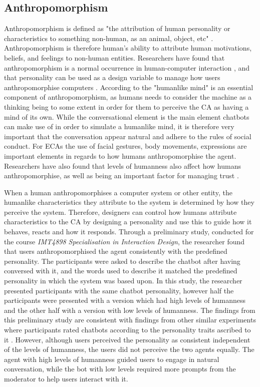 \vspace{2,5mm}

\subsection{Anthropomorphism}
    \label{anthropomorphism}
Anthropomorphism is defined as "the attribution of human personality or characteristics to something non-human, as an animal, object, etc" \citep{oxd2018}. Anthropomorphism is therefore human's ability to attribute human motivations, beliefs, and feelings to non-human entities. Researchers have found that anthropomorphism is a normal occurrence in human-computer interaction \citep{Reeves1996,Cohen2004,Pearl2017,Lee2010}, and that personality can be used as a design variable to manage how users anthropomorphise computers \citep{Xiao2005}. According to \cite{Schroeder2016} the "humanlike mind" is an essential component of anthropomorphism, as humans needs to consider the machine as a thinking being to some extent in order for them to perceive the CA as having a mind of its own. While the conversational element is the main element chatbots can make use of in order to simulate a humanlike mind, it is therefore very important that the conversation appear natural and adhere to the rules of social conduct. For ECAs the use of facial gestures, body movements, expressions are important elements in regards to how humans anthropomorphise the agent. Researchers have also found that levels of humanness also affect how humans anthropomorphise, as well as being an important factor for managing trust \citep{Prada2003,Meyer2016,Dautenhahn2002,Terada2015,Epley2007,Lee2004}.

When a human anthropomorphises a computer system or other entity, the humanlike characteristics they attribute to the system is determined by how they perceive the system. Therefore, designers can control how humans attribute characteristics to the CA by designing a personality and use this to guide how it behaves, reacts and how it responds. Through a preliminary study, conducted for the course \textit{IMT4898 Specialisation in Interaction Design}, the researcher found that users anthropomorphised the agent consistently with the predefined personality. The participants were asked to describe the chatbot after having conversed with it, and the words used to describe it matched the predefined personality in which the system was based upon. In this study, the researcher presented participants with the same chatbot personality, however half the participants were presented with a version which had high levels of humanness and the other half with a version with low levels of humanness. The findings from this preliminary study are consistent with findings from other similar experiments where participants rated chatbots according to the personality traits ascribed to it \citep{Holtgraves2007}. However, although users perceived the personality as consistent independent of the levels of humanness, the users did not perceive the two agents equally. The agent with high levels of humanness guided users to engage in natural conversation, while the bot with low levels required more prompts from the moderator to help users interact with it.

